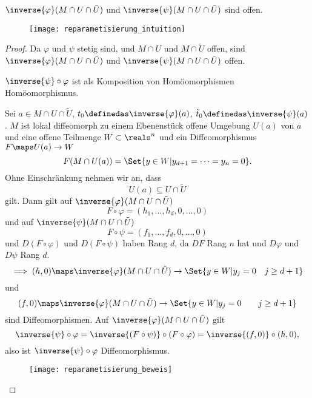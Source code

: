 \begin{bemerkungen*}
  \( \inverse{\varphi}(M\cap U\cap \tilde{U}) \) und \( \inverse{\psi}(M\cap U\cap \tilde{U}) \) sind offen.
\end{bemerkungen*}
\begin{figure}[H]
  \centering
  \texttt{[image: reparametisierung\_intuition]}
  \label{fig:reparametisierung_intuition}
\end{figure}
\begin{proof}
  Da \( \varphi \) und \( \psi \) stetig sind, und \( M\cap U \) und \( M\cap \tilde{U} \) offen, sind \( \inverse{\varphi}(M\cap U\cap \tilde{U}) \) und \( \inverse{\psi}(M\cap U\cap \tilde{U}) \) offen.
  
  \( \inverse{\psi}\circ \varphi \) ist als Komposition von Homöomorphismen Homöomorphismus.

  Sei \( a\in M\cap U\cap \tilde{U} \), \( t_0\definedas \inverse{\varphi}(a) \), \( \tilde{t}_0\definedas \inverse{\psi}(a) \). \( M \) ist lokal diffeomorph zu einem Ebenenstück \timplies \texists  offene Umgebung \( U(a) \) von \( a \) und eine offene Teilmenge \( W\subset \reals^n \) \sd und ein Diffeomorphismus \( 
    F\maps U(a)\to W \) \sd
    \begin{equation*}
      F(M\cap U(a))=\Set{y\in W|y_{d+1}=\dotsb=y_n=0}.
    \end{equation*}
  Ohne Einschränkung nehmen wir an, dass 
  \begin{equation*}
    U(a)\subseteq U\cap \tilde{U}
  \end{equation*}
  gilt. Dann gilt auf \( \inverse{\varphi}(M\cap U\cap \tilde{U}) \)
  \begin{equation*}
    F\circ \varphi=(h_1,\dotsc,h_d,0,\dotsc,0)
  \end{equation*}
  und auf \( \inverse{\psi}(M\cap U\cap \tilde{U}) \)
  \begin{equation*}
    F\circ \psi=(f_1,\dotsc,f_d,0,\dotsc,0)
  \end{equation*}
  und \( D(F\circ \varphi) \) und \( D(F\circ \psi) \) haben Rang \( d \), da \( DF \) Rang \( n \) hat und \( D\varphi \) und \( D\psi \) Rang \( d \).
  \begin{equation*}
    \implies (h,0)\maps \inverse{\varphi}(M\cap U\cap \tilde{U})\to \Set{y\in W|y_j=0\quad j\geq d+1}
  \end{equation*}
  und
  \begin{equation*}
    (f,0)\maps \inverse{\varphi}(M\cap U\cap \tilde{U})\to \Set{y\in W|y_j=0\qquad j\geq d+1}
  \end{equation*}
  sind Diffeomorphismen. Auf \( \inverse{\varphi}(M\cap U\cap \tilde{U}) \) gilt
  \begin{equation*}
    \inverse{\psi}\circ \varphi=\inverse{(F\circ \psi)}\circ (F\circ \varphi)=\inverse{(f,0)}\circ (h,0),
  \end{equation*}
  also ist \( \inverse{\psi}\circ \varphi \) Diffeomorphismus.
  \begin{figure}[H]
    \centering
    \texttt{[image: reparametisierung\_beweis]}
    \label{fig:reparametisierung_beweis}
  \end{figure}
\end{proof}